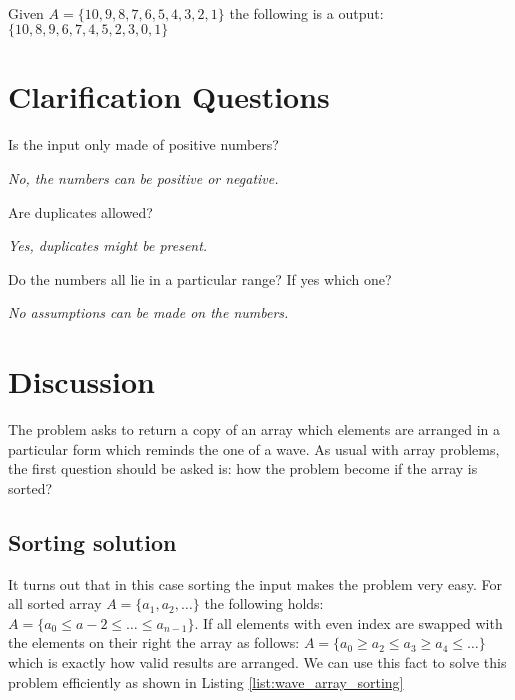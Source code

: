 \begin{example}
	\hfill \\
	Given $A= \{10,9,8,7,6,5,4,3,2,1\}$ the following is a output: $\{10, 8, 9, 6, 7, 4, 5, 2, 3, 0, 1 \}$

\end{example}

\section{Clarification Questions}

\begin{QandA}
	\item Is the input only made of positive numbers?
	\begin{answered}
		\textit{No, the numbers can be positive or negative.}
	\end{answered}
	\item Are duplicates allowed?
	\begin{answered}
		\textit{Yes, duplicates might be present.}
	\end{answered}
	\item Do the numbers all lie in a particular range? If yes which one?
	\begin{answered}
		\textit{No assumptions can be made on the numbers.}
	\end{answered}
\end{QandA}

\section{Discussion}
\label{wave_array:sec:discussion}
The problem asks to return a copy of an array which elements are arranged in a particular form which reminds the one of a wave.
As usual with array problems, the first question should be asked is: how the problem become if the array is sorted?

\subsection{Sorting solution}
\label{wave_array:sec:sorting}

It turns out that in this case sorting the input makes the problem very easy. For all sorted array $A=\{a_1,a_2,\ldots\}$  the following holds: $A=\{a_0 \leq a-2 \leq \ldots \leq a_{n-1}\}$. If all elements with even index are swapped with the elements on their right the array as follows: $A=\{a_0 \geq a_2 \leq a_3 \geq a_4 \leq \ldots\}$ which is exactly how valid results are arranged. We can use this fact to solve this problem efficiently as shown in Listing \ref{list:wave_array_sorting}

